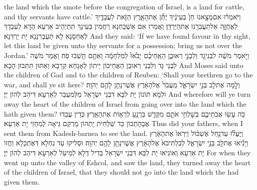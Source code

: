 {the land which the \lord\space smote before the congregation of Israel, is a land for cattle, and thy servants have cattle.’}{}
{וַיֹּאמְר֗וּ אִם\maqqaf מָצָ֤אנוּ חֵן֙ בְּעֵינֶ֔יךָ יֻתַּ֞ן אֶת\maqqaf הָאָ֧רֶץ הַזֹּ֛את לַעֲבָדֶ֖יךָ לַאֲחֻזָּ֑ה אַל\maqqaf תַּעֲבִרֵ֖נוּ אֶת\maqqaf הַיַּרְדֵּֽן׃}
{וַאֲמַרוּ אִם אַשְׁכַּחְנָא רַחֲמִין בְּעֵינָךְ תִּתְיְהֵיב אַרְעָא הָדָא לְעַבְדָךְ לְאַחְסָנָא לָא תַעְבְּרִנַּנָא יָת יַרְדְּנָא׃}
{And they said: ‘If we have found favour in thy sight, let this land be given unto thy servants for a possession; bring us not over the Jordan.’}{}
{וַיֹּ֣אמֶר מֹשֶׁ֔ה לִבְנֵי\maqqaf גָ֖ד וְלִבְנֵ֣י רְאוּבֵ֑ן הַאַֽחֵיכֶ֗ם יָבֹ֙אוּ֙ לַמִּלְחָמָ֔ה וְאַתֶּ֖ם תֵּ֥שְׁבוּ פֹֽה׃}
{וַאֲמַר מֹשֶׁה לִבְנֵי גָּד וְלִבְנֵי רְאוּבֵן הַאֲחֵיכוֹן יֵיתוֹן לְאָגָחָא קְרָבָא וְאַתּוּן תִּתְּבוּן הָכָא׃}
{And Moses said unto the children of Gad and to the children of Reuben: ‘Shall your brethren go to the war, and shall ye sit here?}{}
{וְלָ֣מָּה  אֶת\maqqaf לֵ֖ב בְּנֵ֣י יִשְׂרָאֵ֑ל מֵֽעֲבֹר֙ אֶל\maqqaf הָאָ֔רֶץ אֲשֶׁר\maqqaf נָתַ֥ן לָהֶ֖ם יְהֹוָֽה׃}
{וּלְמָא תוֹנוֹן יָת לִבָּא דִּבְנֵי יִשְׂרָאֵל מִלְּמִעְבַּר לְאַרְעָא דִּיהַב לְהוֹן יְיָ׃}
{And wherefore will ye turn away the heart of the children of Israel from going over into the land which the \lord\space hath given them?}{}
{כֹּ֥ה עָשׂ֖וּ אֲבֹתֵיכֶ֑ם בְּשׇׁלְחִ֥י אֹתָ֛ם מִקָּדֵ֥שׁ בַּרְנֵ֖עַ לִרְא֥וֹת אֶת\maqqaf הָאָֽרֶץ׃}
{כְּדֵין עֲבַדוּ אֲבָהָתְכוֹן כַּד שְׁלַחִית יָתְהוֹן מֵרְקַם גֵּיאָה לְמִחְזֵי יָת אַרְעָא׃}
{Thus did your fathers, when I sent them from Kadesh-barnea to see the land.}{}
{וַֽיַּעֲל֞וּ עַד\maqqaf נַ֣חַל אֶשְׁכּ֗וֹל וַיִּרְאוּ֙ אֶת\maqqaf הָאָ֔רֶץ וַיָּנִ֕יאוּ אֶת\maqqaf לֵ֖ב בְּנֵ֣י יִשְׂרָאֵ֑ל לְבִלְתִּי\maqqaf בֹא֙ אֶל\maqqaf הָאָ֔רֶץ אֲשֶׁר\maqqaf נָתַ֥ן לָהֶ֖ם יְהֹוָֽה׃}
{וּסְלִיקוּ עַד נַחְלָא דְּאֶתְכָּלָא וַחֲזוֹ יָת אַרְעָא וְאוֹנִיאוּ יָת לִבָּא דִּבְנֵי יִשְׂרָאֵל בְּדִיל דְּלָא לְמֵיעַל לְאַרְעָא דִּיהַב לְהוֹן יְיָ׃}
{For when they went up unto the valley of Eshcol, and saw the land, they turned away the heart of the children of Israel, that they should not go into the land which the \lord\space had given them.}{}
